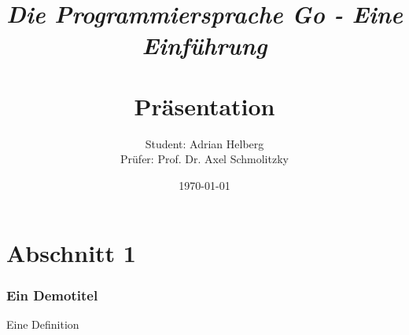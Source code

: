 \documentclass{beamer}
\title{
	\Large{\textit{\\Die Programmiersprache Go - Eine Einf\"uhrung}} \\
	\Large{\textbf{\\Pr\"asentation}}
}
\author{Student: Adrian Helberg \\Prüfer: Prof. Dr. Axel Schmolitzky}
\date{\today}
\begin{document}
\maketitle

\frame{\tableofcontents[currentsection]}

\section{Abschnitt 1}
\begin{frame}
  \frametitle{Ein Demotitel}

  \begin{Definition}
    Eine Definition
  \end{Definition}

\end{frame}
\end{document}
